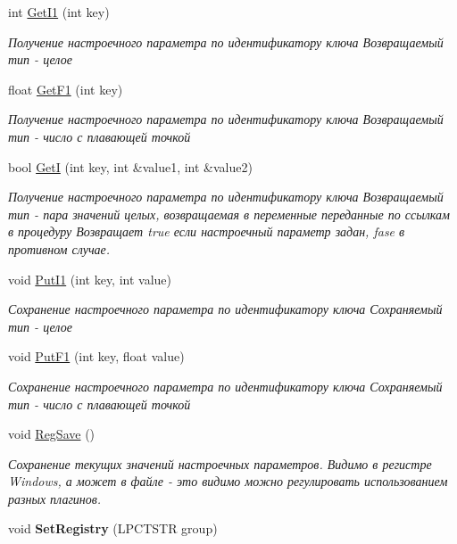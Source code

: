 \begin{DoxyCompactItemize}
\item 
int \hyperlink{class_c_v_i_engine_config_a41be84d81a153f85554171555094f20d}{Get\+I1} (int key)
\begin{DoxyCompactList}\small\item\em Получение настроечного параметра по идентификатору ключа Возвращаемый тип -\/ целое \end{DoxyCompactList}\item 
float \hyperlink{class_c_v_i_engine_config_a1f474cfcfadee9f76567fc84a10c5ad9}{Get\+F1} (int key)
\begin{DoxyCompactList}\small\item\em Получение настроечного параметра по идентификатору ключа Возвращаемый тип -\/ число с плавающей точкой \end{DoxyCompactList}\item 
bool \hyperlink{class_c_v_i_engine_config_a7721cb9715f79730d622f7e9c930a333}{Get\+I} (int key, int \&value1, int \&value2)
\begin{DoxyCompactList}\small\item\em Получение настроечного параметра по идентификатору ключа Возвращаемый тип -\/ пара значений целых, возвращаемая в переменные переданные по ссылкам в процедуру Возвращает true если настроечный параметр задан, fase в противном случае. \end{DoxyCompactList}\item 
void \hyperlink{class_c_v_i_engine_config_a5a4a7b7c7a9c1152998eabddf2ed020d}{Put\+I1} (int key, int value)
\begin{DoxyCompactList}\small\item\em Сохранение настроечного параметра по идентификатору ключа Сохраняемый тип -\/ целое \end{DoxyCompactList}\item 
void \hyperlink{class_c_v_i_engine_config_a6ac9297ee130cbf9b4d44bf812b3dd89}{Put\+F1} (int key, float value)
\begin{DoxyCompactList}\small\item\em Сохранение настроечного параметра по идентификатору ключа Сохраняемый тип -\/ число с плавающей точкой \end{DoxyCompactList}\item 
void \hyperlink{class_c_v_i_engine_config_ad063dddb079aa1951199b446253ccbf3}{Reg\+Save} ()
\begin{DoxyCompactList}\small\item\em Сохранение текущих значений настроечных параметров. Видимо в регистре Windows, а может в файле -\/ это видимо можно регулировать использованием разных плагинов. \end{DoxyCompactList}\item 
\hypertarget{class_c_v_i_engine_config_a128b4b313ccf161aaccdf47af2f2a208}{void {\bfseries Set\+Registry} (L\+P\+C\+T\+S\+T\+R group)}\label{class_c_v_i_engine_config_a128b4b313ccf161aaccdf47af2f2a208}

\end{DoxyCompactItemize}


